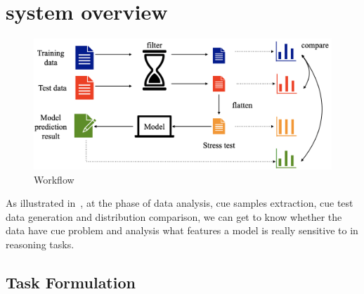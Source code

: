 \section{system overview}
\label{sec:system}

\begin{figure}[th]
\centering
\includegraphics[width=1.0\columnwidth]{picture/framework.jpg}
\caption{Workflow}
\label{fig:framework}
\end{figure}

As illustrated in~, at the phase of data analysis, 
cue samples extraction, cue test data generation 
and distribution comparison, we can get to know 
whether the data have cue problem and analysis what features a model is really sensitive 
to in reasoning tasks.


\subsection{Task Formulation}

